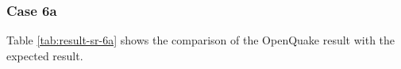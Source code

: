 \subsubsection{Case 6a}


Table \ref{tab:result-sr-6a} shows the comparison of the OpenQuake result with the expected result.